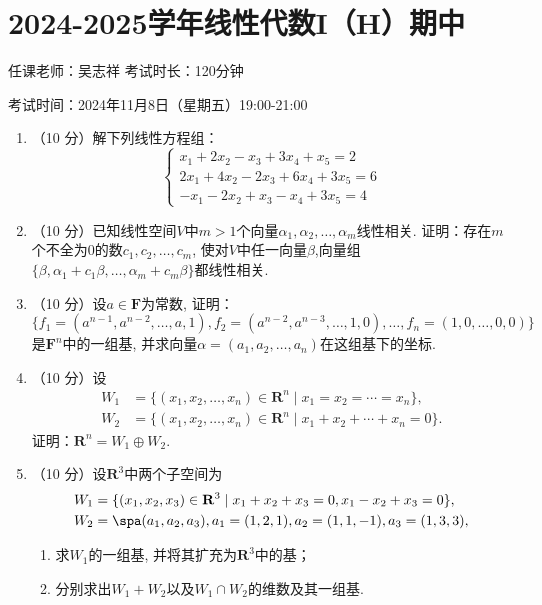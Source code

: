 \section{2024-2025学年线性代数I（H）期中}

\begin{center}
    任课老师：吴志祥\hspace{4em} 考试时长：120分钟

    考试时间：2024年11月8日（星期五）19:00-21:00
\end{center}

\begin{enumerate}
    \item （10 分）解下列线性方程组：
          \[ \begin{cases}
                x_1 + 2x_2 - x_3 + 3x_4 +x_5 = 2     \\
                2x_1 + 4x_2 - 2x_3 + 6x_4 + 3x_5 = 6 \\
                -x_1 - 2x_2 + x_3 - x_4 + 3x_5 = 4
            \end{cases} \]

    \item （10 分）已知线性空间\(V\)中\(m > 1\)个向量\(\alpha_1,\alpha_2,\ldots,\alpha_{m}\)线性相关. 证明：存在\(m\)个不全为\(0\)的数\(c_1,c_2,\ldots,c_{m}\), 使对\(V\)中任一向量\(\beta\),向量组\(\{ \beta,\alpha_1 + c_1\beta,\ldots,\alpha_{m} + c_{m}\beta \}\)都线性相关.

    \item （10 分）设\(a \in \mathbf{F}\)为常数, 证明：
          \[\{ f_1 = ( a^{n - 1},a^{n - 2},\ldots,a,1 ),f_2 = ( a^{n - 2},a^{n - 3},\ldots,1,0 ),\ldots,f_{n} = (1,0,\ldots,0,0)\}\]
          是\(\mathbf{F}^{n}\)中的一组基, 并求向量\(\alpha = ( a_1,a_2,\ldots,a_{n} )\)在这组基下的坐标.

    \item （10 分）设
          \begin{align*}
              W_1 &= \{ ( x_1,x_2,\ldots,x_{n} ) \in  \mathbf{R}^{n} \mid x_1 = x_2 = \cdots = x_{n} \}, \\
              W_2 &= \{ ( x_1,x_2,\ldots,x_{n} ) \in  \mathbf{R}^{n} \mid x_1 + x_2 + \cdots + x_{n} = 0 \}.
          \end{align*}
          证明：\(\mathbf{R}^{n} = W_1 \oplus W_2\).

    \item （10 分）设\(\mathbf{R}^3\)中两个子空间为
          \begin{align*}
              W_1 &= \{ ( x_1,x_2,x_3 ) \in \mathbf{R}^3 \mid x_1 + x_2 + x_3 = 0,x_1 - x_2 + x_3 = 0 \}, \\
              W_2 &= \spa( a_1,a_2,a_3 ),a_1 = (1,2,1),a_2 = (1,1, - 1),a_3 = (1,3,3),
          \end{align*}
          \begin{enumerate}
              \item 求\(W_1\)的一组基, 并将其扩充为\(\mathbf{R}^3\)中的基；
              \item 分别求出\(W_1 + W_2\)以及\(W_1 \cap W_2\)的维数及其一组基.
          \end{enumerate}


\end{enumerate}
